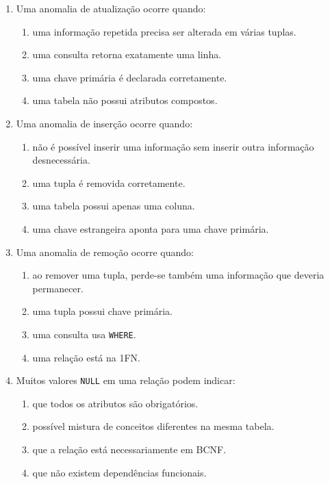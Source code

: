 \documentclass[12pt,a4paper]{article}
\begin{document}
\begin{enumerate}[label=\textbf{Q\arabic*.}]
\item Uma anomalia de atualização ocorre quando:

\begin{enumerate}[label=\alph*)]
    \item uma informação repetida precisa ser alterada em várias tuplas.
    \item uma consulta retorna exatamente uma linha.
    \item uma chave primária é declarada corretamente.
    \item uma tabela não possui atributos compostos.
\end{enumerate}

\item Uma anomalia de inserção ocorre quando:

\begin{enumerate}[label=\alph*)]
    \item não é possível inserir uma informação sem inserir outra informação desnecessária.
    \item uma tupla é removida corretamente.
    \item uma tabela possui apenas uma coluna.
    \item uma chave estrangeira aponta para uma chave primária.
\end{enumerate}

\item Uma anomalia de remoção ocorre quando:

\begin{enumerate}[label=\alph*)]
    \item ao remover uma tupla, perde-se também uma informação que deveria permanecer.
    \item uma tupla possui chave primária.
    \item uma consulta usa \texttt{WHERE}.
    \item uma relação está na 1FN.
\end{enumerate}

\item Muitos valores \texttt{NULL} em uma relação podem indicar:

\begin{enumerate}[label=\alph*)]
    \item que todos os atributos são obrigatórios.
    \item possível mistura de conceitos diferentes na mesma tabela.
    \item que a relação está necessariamente em BCNF.
    \item que não existem dependências funcionais.
\end{enumerate}


\end{enumerate}
\end{document}
